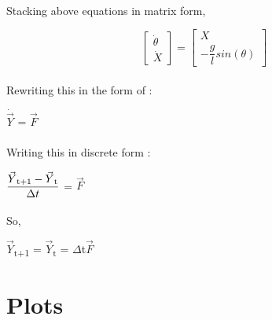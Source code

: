 \documentclass{article}
\begin{document}
\paragraph{}Stacking above equations in matrix form,
\begin{center}
$$
\begin{bmatrix}
\dot{\theta} \\
\dot{X}
\end{bmatrix}
=
\begin{bmatrix}
X \\
-\dfrac{g}{l}sin(\theta)
\end{bmatrix}
$$
\end{center}

\paragraph{}Rewriting this in the form of :
\begin{center}
$\dot{\vec{Y}}$ = $\vec{F}$
\end{center}

\paragraph{}Writing this in discrete form :
\begin{center}
$\dfrac{\vec{Y}\textsubscript{t+1}-\vec{Y}\textsubscript{t}}{\Delta t}$ = $\vec{F}$
\end{center}

\paragraph{}So,
\begin{center}
$\vec{Y}$\textsubscript{t+1} = $\vec{Y}$\textsubscript{t} = $\Delta$t$\vec{F}$
\end{center}

\section{Plots}
\end{document}
